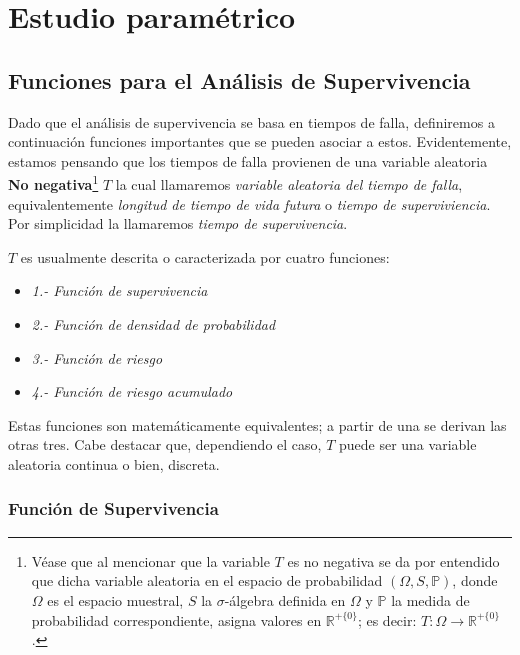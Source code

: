 \documentclass[
  a4paper,
  oneside,
  openany]{book}
\providecommand{\tightlist}{%
  \setlength{\itemsep}{0pt}\setlength{\parskip}{0pt}}
\begin{document}
\hypertarget{part-estudio-paramuxe9trico}{%
\part{Estudio paramétrico}\label{part-estudio-paramuxe9trico}}

\hypertarget{funciones-para-el-anuxe1lisis-de-supervivencia}{%
\chapter{Funciones para el Análisis de Supervivencia}\label{funciones-para-el-anuxe1lisis-de-supervivencia}}

Dado que el análisis de supervivencia se basa en tiempos de falla, definiremos a continuación funciones importantes que se pueden asociar a estos. Evidentemente, estamos pensando que los tiempos de falla provienen de una variable aleatoria \textbf{No negativa}\footnote{Véase que al mencionar que la variable \(T\) es no negativa se da por entendido que dicha variable aleatoria en el espacio de probabilidad \((\Omega, S, \mathbb{P})\), donde \(\Omega\) es el espacio muestral, \(S\) la \(\sigma\)-álgebra definida en \(\Omega\) y \(\mathbb{P}\) la medida de probabilidad correspondiente, asigna valores en \(\mathbb{R}^{+\{0\}}\); es decir: \(T:\Omega\rightarrow\mathbb{R}^{+\{0\}}\).} \(T\) la cual llamaremos \emph{variable aleatoria del tiempo de falla}, equivalentemente \emph{longitud de tiempo de vida futura} o \emph{tiempo de superviviencia}. Por simplicidad la llamaremos \emph{tiempo de supervivencia}.

\(T\) es usualmente descrita o caracterizada por cuatro funciones:

\begin{itemize}
\tightlist
\item
  \emph{1.- Función de supervivencia}
\item
  \emph{2.- Función de densidad de probabilidad}
\item
  \emph{3.- Función de riesgo}
\item
  \emph{4.- Función de riesgo acumulado}
\end{itemize}

Estas funciones son matemáticamente equivalentes; a partir de una se derivan las otras tres. Cabe destacar que, dependiendo el caso, \(T\) puede ser una variable aleatoria continua o bien, discreta.

\hypertarget{funciuxf3n-de-supervivencia}{%
\section{Función de Supervivencia}\label{funciuxf3n-de-supervivencia}}
\end{document}
